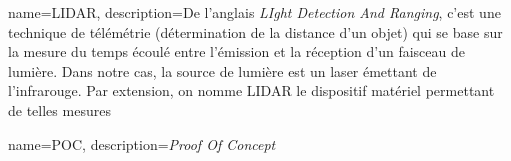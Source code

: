 \makeglossaries

{
	name={LIDAR},
	description={De l'anglais \emph{LIght Detection And Ranging}, c'est une technique de télémétrie (détermination de la distance d'un objet) qui se base sur la mesure du temps écoulé entre l'émission et la réception d'un faisceau de lumière. Dans notre cas, la source de lumière est un laser émettant de l'infrarouge. Par extension, on nomme LIDAR le dispositif matériel permettant de telles mesures}
}

{
	name={POC},
	description={\emph{Proof Of Concept}}
}
